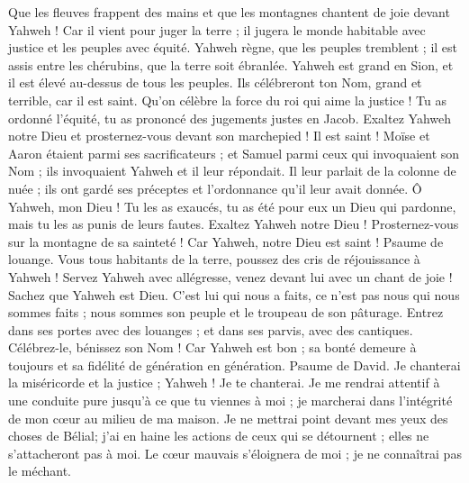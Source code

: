 \begin{multicols}{2}
Que les fleuves frappent des mains et que les montagnes chantent de joie
devant Yahweh ! Car il vient pour juger la terre ; il jugera le monde habitable avec justice et les peuples avec équité.
\VerseOne{}Yahweh règne, que les peuples tremblent ; il est assis entre les chérubins, que la terre soit ébranlée.
Yahweh est grand en Sion, et il est élevé au-dessus de tous les peuples.
Ils célébreront ton Nom, grand et terrible, car il est saint.
Qu'on célèbre la force du roi qui aime la justice ! Tu as ordonné l'équité, tu as prononcé des jugements justes en Jacob.
Exaltez Yahweh notre Dieu et prosternez-vous devant son marchepied ! Il est saint !
Moïse et Aaron étaient parmi ses sacrificateurs ; et Samuel parmi ceux qui invoquaient son Nom ; ils invoquaient Yahweh et il leur répondait.
Il leur parlait de la colonne de nuée ; ils ont gardé ses préceptes et l'ordonnance qu'il leur avait donnée.
Ô Yahweh, mon Dieu ! Tu les as exaucés, tu as été pour eux un Dieu qui pardonne, mais tu les as punis de leurs fautes.
Exaltez Yahweh notre Dieu ! Prosternez-vous sur la montagne de sa sainteté ! Car Yahweh, notre Dieu est saint !
\VerseOne{}Psaume de louange. Vous tous habitants de la terre, poussez des cris de réjouissance à Yahweh !
Servez Yahweh avec allégresse, venez devant lui avec un chant de joie !
Sachez que Yahweh est Dieu. C'est lui qui nous a faits, ce n'est pas nous qui nous sommes faits ; nous sommes son peuple et le troupeau de son pâturage.
Entrez dans ses portes avec des louanges ; et dans ses parvis, avec des cantiques. Célébrez-le, bénissez son Nom !
Car Yahweh est bon ; sa bonté demeure à toujours et sa fidélité de génération en génération.
\VerseOne{}Psaume de David. Je chanterai la miséricorde et la justice ; Yahweh ! Je te chanterai.
Je me rendrai attentif à une conduite pure jusqu'à ce que tu viennes à moi ; je marcherai dans l'intégrité de mon cœur au milieu de ma maison.
Je ne mettrai point devant mes yeux des choses de Bélial; j'ai en haine les actions de ceux qui se détournent ; elles ne s'attacheront pas à moi.
Le cœur mauvais s'éloignera de moi ; je ne connaîtrai pas le méchant.

\end{multicols}
